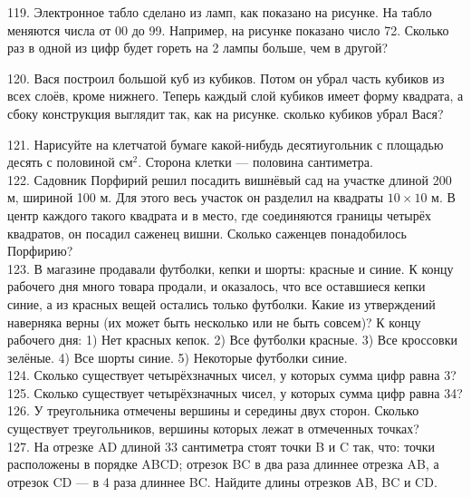 119. Электронное табло сделано из ламп, как показано на рисунке. На табло меняются числа от 00 до 99. Например, на рисунке показано число 72. Сколько раз в одной из цифр будет гореть на 2 лампы больше, чем в другой?
\begin{center}
\begin{figure}[ht!]
\end{figure}
\end{center}
120. Вася построил большой куб из кубиков. Потом он убрал часть кубиков из всех слоёв, кроме нижнего. Теперь каждый слой кубиков имеет форму квадрата, а сбоку конструкция выглядит так, как на рисунке. сколько кубиков убрал Вася?
\begin{center}
\begin{figure}[ht!]
\end{figure}
\end{center}
121. Нарисуйте на клетчатой бумаге какой-нибудь десятиугольник с площадью десять с половиной $\text{см}^2.$ Сторона клетки --- половина сантиметра.\\
122. Садовник Порфирий решил посадить вишнёвый сад на участке длиной 200 м, шириной 100 м. Для этого весь участок он разделил на квадраты $10\times10$ м. В центр каждого такого квадрата и в место, где соединяются границы четырёх квадратов, он посадил саженец вишни. Сколько саженцев понадобилось Порфирию?\\
123. В магазине продавали футболки, кепки и шорты: красные и синие. К концу рабочего дня много товара продали, и оказалось, что все оставшиеся кепки синие, а из красных вещей остались только футболки. Какие из утверждений наверняка верны (их может быть несколько или не быть совсем)? К концу рабочего дня: 1) Нет красных кепок. 2) Все футболки красные. 3) Все кроссовки зелёные. 4) Все шорты синие. 5) Некоторые футболки синие.\\
124. Сколько существует четырёхзначных чисел, у которых сумма цифр равна 3?\\
125. Сколько существует четырёхзначных чисел, у которых сумма цифр равна 34?\\
126. У треугольника отмечены вершины и середины двух сторон. Сколько существует треугольников, вершины которых лежат в отмеченных точках?\\
127. На отрезке AD длиной 33 сантиметра стоят точки B и C так, что: точки расположены в порядке ABCD; отрезок BC в два раза длиннее отрезка AB, а отрезок CD --- в 4 раза длиннее BC. Найдите длины отрезков AB, BC и CD.\\
